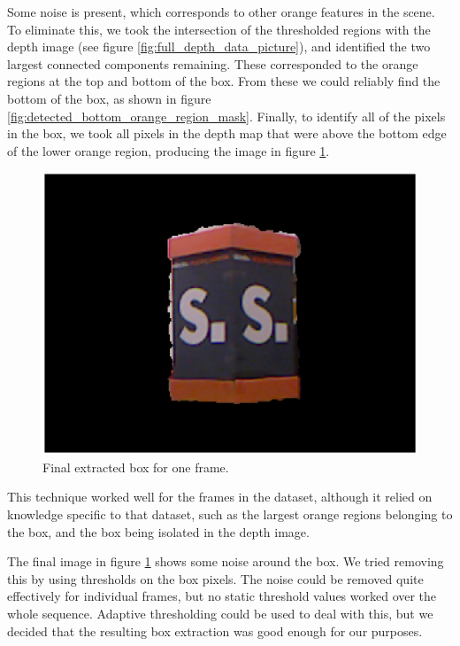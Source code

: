 \documentclass[12pt,a4paper,onecolumn]{article}
\begin{document}
Some noise is present, which corresponds to other orange features in the scene.  To eliminate this, we took the intersection of the thresholded regions with the depth image (see figure \ref{fig:full_depth_data_picture}), and identified the two largest connected components remaining.  These corresponded to the orange regions at the top and bottom of the box.  From these we could reliably find the bottom of the box, as shown in figure \ref{fig:detected_bottom_orange_region_mask}.  Finally, to identify all of the pixels in the box, we took all pixels in the depth map that were above the bottom edge of the lower orange region, producing the image in figure \ref{fig:extracted_box_example}.

\begin{figure}[!ht]
  \centering
  \includegraphics[width=1.0\textwidth]{figs/extracted_box_example}
  \caption{Final extracted box for one frame.}
  \label{fig:extracted_box_example}
\end{figure}

This technique worked well for the frames in the dataset, although it relied on knowledge specific to that dataset, such as the largest orange regions belonging to the box, and the box being isolated in the depth image.

The final image in figure \ref{fig:extracted_box_example} shows some noise around the box.  We tried removing this by using thresholds on the box pixels.  The noise could be removed quite effectively for individual frames, but no static threshold values worked over the whole sequence.  Adaptive thresholding could be used to deal with this, but we decided that the resulting box extraction was good enough for our purposes.
\end{document}
